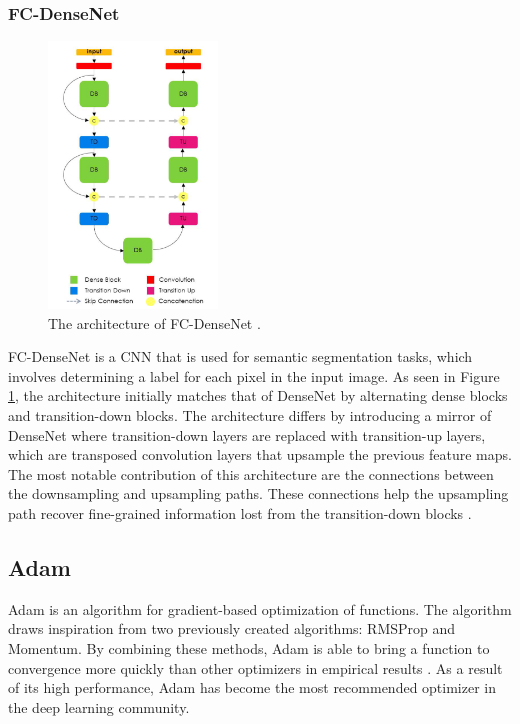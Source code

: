 
\subsubsection{FC-DenseNet}
\begin{figure}
    \centering
    \includegraphics[width=0.40\textwidth]{images/fc-densenet.png}
    \caption{The architecture of FC-DenseNet \cite{fc-densenet}.}
    \label{fc-densenet}
\end{figure}
FC-DenseNet is a CNN that is used for semantic segmentation tasks, which involves determining a label for each pixel in the input image. As seen in Figure \ref{fc-densenet}, the architecture initially matches that of DenseNet by alternating dense blocks and transition-down blocks. The architecture differs by introducing a mirror of DenseNet where transition-down layers are replaced with transition-up layers, which are transposed convolution layers that upsample the previous feature maps. The most notable contribution of this architecture are the connections between the downsampling and upsampling paths. These connections help the upsampling path recover fine-grained information lost from the transition-down blocks \cite{fc-densenet}.

\subsection{Adam}
Adam is an algorithm for gradient-based optimization of functions. The algorithm draws inspiration from two previously created algorithms: RMSProp and Momentum. By combining these methods, Adam is able to bring a function to convergence more quickly than other optimizers in empirical results \cite{adam}. As a result of its high performance, Adam has become the most recommended optimizer in the deep learning community.
